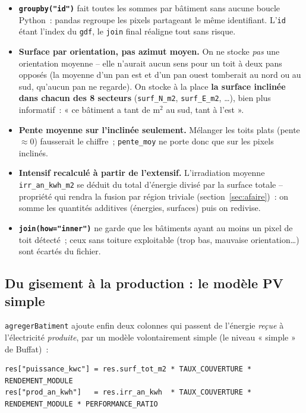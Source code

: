 \documentclass[11pt,a4paper]{article}
\newcommand{\fonction}[1]{\texttt{#1}}
\begin{document}
\begin{itemize}
  \item \textbf{\fonction{groupby("id")}} fait toutes les sommes par bâtiment
    sans aucune boucle Python~: pandas regroupe les pixels partageant le même
    identifiant. L'\fonction{id} étant l'index du \fonction{gdf}, le
    \fonction{join} final réaligne tout sans risque.
  \item \textbf{Surface par orientation, pas azimut moyen.} On ne stocke
    \emph{pas} une orientation moyenne -- elle n'aurait aucun sens pour un toit à
    deux pans opposés (la moyenne d'un pan est et d'un pan ouest tomberait au
    nord ou au sud, qu'aucun pan ne regarde). On stocke à la place \textbf{la
    surface inclinée dans chacun des 8 secteurs} (\fonction{surf\_N\_m2},
    \fonction{surf\_E\_m2}, \ldots), bien plus informatif~: « ce bâtiment a tant
    de m$^2$ au sud, tant à l'est ».
  \item \textbf{Pente moyenne sur l'inclinée seulement.} Mélanger les toits plats
    (pente $\approx 0$) fausserait le chiffre~; \fonction{pente\_moy} ne porte
    donc que sur les pixels inclinés.
  \item \textbf{Intensif recalculé à partir de l'extensif.} L'irradiation
    moyenne \fonction{irr\_an\_kwh\_m2} se déduit du total d'énergie divisé par
    la surface totale -- propriété qui rendra la fusion par région triviale
    (section~\ref{sec:afaire})~: on somme les quantités additives (énergies,
    surfaces) puis on redivise.
  \item \textbf{\fonction{join(how="inner")}} ne garde que les bâtiments ayant au
    moins un pixel de toit détecté~; ceux sans toiture exploitable
    (trop bas, mauvaise orientation\ldots) sont écartés du fichier.
\end{itemize}

\subsection{Du gisement à la production : le modèle PV simple}

\fonction{agregerBatiment} ajoute enfin deux colonnes qui passent de l'énergie
\emph{reçue} à l'électricité \emph{produite}, par un modèle volontairement simple
(le niveau « simple » de Buffat)~:

\begin{lstlisting}
res["puissance_kwc"] = res.surf_tot_m2 * TAUX_COUVERTURE * RENDEMENT_MODULE
res["prod_an_kwh"]   = res.irr_an_kwh  * TAUX_COUVERTURE * RENDEMENT_MODULE * PERFORMANCE_RATIO
\end{lstlisting}
\end{document}
